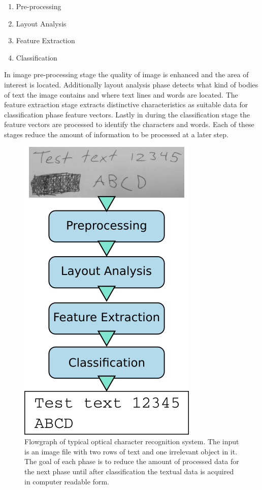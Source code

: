 \documentclass{article}
\begin{document}
    \begin{enumerate}
      \item{Pre-processing}
      \item{Layout Analysis}
      \item{Feature Extraction}
      \item{Classification}
    \end{enumerate}

    In image pre-processing stage the quality of image is enhanced and the area of interest is located. Additionally layout analysis phase detects what kind of bodies of text the image contains and where text lines and words are located. The feature extraction stage extracts distinctive characteristics as suitable data for classification phase feature vectors. Lastly in during the classification stage the feature vectors are processed to identify the characters and words. Each of these stages reduce the amount of information to be processed at a later step. \cite{Cheriet2007}

    \begin{figure}
      \centering
      \includegraphics[natwidth=324,natheight=566,scale=0.4]{flowgraph.png}
      \caption{Flowgraph of typical optical character recognition system. The input is an image file with two rows of text and one irrelevant object in it. The goal of each phase is to reduce the amount of processed data for the next phase until after classification the textual data is acquired in computer readable form. \label{fig:flow} }
    \end{figure}
\end{document}
